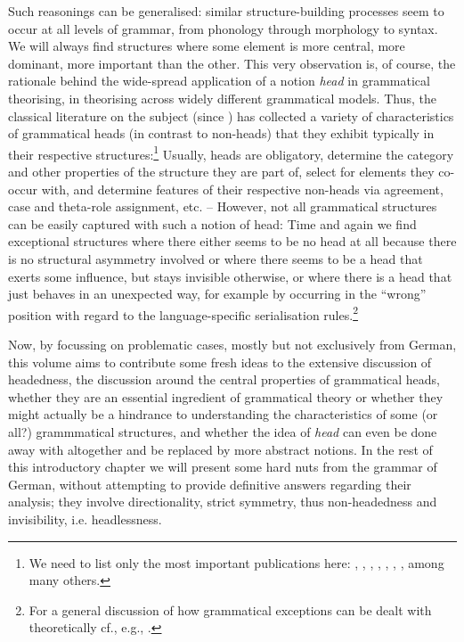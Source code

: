 \documentclass[output=paper
  ,nobabel
  ,draftmode
  ,colorlinks, citecolor=brown
]{langscibook}
\begin{document}
Such reasonings can be generalised: similar structure-building processes seem to occur at all levels
of grammar, from phonology through morphology to syntax. We will always find structures where some
element is more central, more dominant, more important than the other. This very observation is, of
course, the rationale behind the wide-spread application of a notion \emph{head} in grammatical
theorising, in theorising across widely different grammatical models. Thus, the classical literature
on the subject (since \citealt{Bloomfield1933}) has collected a variety of characteristics of
grammatical heads (in contrast to non-heads) that they exhibit typically in their respective
structures:\footnote{We need to list only the most important publications here: \citet{Lieber1981},
  \citet{Williams1981}, \citet{Selkirk1982}, \citet{Zwicky85a}, \citet{Hudson1987},
  \citet{CorbettEtAl1993}, \citet{Croft1996}, among many others.} Usually, heads are obligatory,
determine the category and other properties of the structure they are part of, select for elements
they co-occur with, and determine features of their respective non-heads via agreement, case and
theta-role assignment, etc. – However, not all grammatical structures can be easily captured with
such a notion of head: Time and again we find exceptional structures where there either seems to be
no head at all because there is no structural asymmetry involved or where there seems to be a head
that exerts some influence, but stays invisible otherwise, or where there is a head that just
behaves in an unexpected way, for example by occurring in the “wrong'' position with regard to the
language-specific serialisation rules.\footnote{For a general discussion of how grammatical
  exceptions can be dealt with theoretically cf., e.g., \citet{SimonWiese2011}.}

Now, by focussing on problematic cases, mostly but not exclusively from German, this volume aims to
contribute some fresh ideas to the extensive discussion of headedness, the discussion around the
central properties of grammatical heads, whether they are an essential ingredient of grammatical
theory or whether they might actually be a hindrance to understanding the characteristics of some
(or all?) grammmatical structures, and whether the idea of \emph{head} can even be done away with
altogether and be replaced by more abstract notions. In the rest of this introductory chapter we
will present some hard nuts from the grammar of German, without attempting to provide definitive
answers regarding their analysis; they involve directionality, strict symmetry, thus non-headedness
and invisibility, i.e. headlessness.
\end{document}
